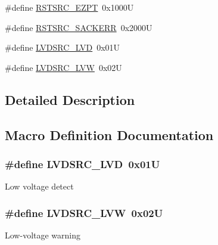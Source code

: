 \begin{DoxyCompactItemize}
\item 
\#define \hyperlink{group___p_e___const__module_ga83e04d23707e6e4f62d5d881277bb4e5}{R\+S\+T\+S\+R\+C\+\_\+\+E\+Z\+P\+T}~0x1000\+U
\item 
\#define \hyperlink{group___p_e___const__module_ga2bdec236f4f5002701b3672613078d95}{R\+S\+T\+S\+R\+C\+\_\+\+S\+A\+C\+K\+E\+R\+R}~0x2000\+U
\item 
\#define \hyperlink{group___p_e___const__module_gac31efdf3ba841e59289e3c11b5bf407c}{L\+V\+D\+S\+R\+C\+\_\+\+L\+V\+D}~0x01\+U
\item 
\#define \hyperlink{group___p_e___const__module_gafe8ffb97db9ede1045779df7d0eac3e4}{L\+V\+D\+S\+R\+C\+\_\+\+L\+V\+W}~0x02\+U
\end{DoxyCompactItemize}


\subsection{Detailed Description}


\subsection{Macro Definition Documentation}
\hypertarget{group___p_e___const__module_gac31efdf3ba841e59289e3c11b5bf407c}{}
\subsubsection[{L\+V\+D\+S\+R\+C\+\_\+\+L\+V\+D}]{\setlength{\rightskip}{0pt plus 5cm}\#define L\+V\+D\+S\+R\+C\+\_\+\+L\+V\+D~0x01\+U}\label{group___p_e___const__module_gac31efdf3ba841e59289e3c11b5bf407c}
Low voltage detect \hypertarget{group___p_e___const__module_gafe8ffb97db9ede1045779df7d0eac3e4}{}
\subsubsection[{L\+V\+D\+S\+R\+C\+\_\+\+L\+V\+W}]{\setlength{\rightskip}{0pt plus 5cm}\#define L\+V\+D\+S\+R\+C\+\_\+\+L\+V\+W~0x02\+U}\label{group___p_e___const__module_gafe8ffb97db9ede1045779df7d0eac3e4}
Low-\/voltage warning \hypertarget{group___p_e___const__module_ga140be6eb76fc072ee4176e965b87b244}{}
